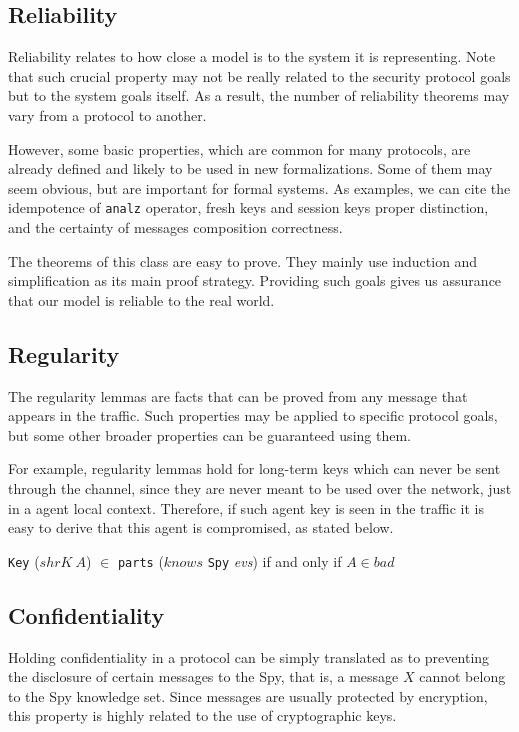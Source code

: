 \subsection{Reliability}
Reliability relates to how close a model is to the system it is representing. Note that such crucial property may not be really related to the security protocol goals but to the system goals itself. As a result, the number of reliability theorems may vary from a protocol to another.

However, some basic properties, which are common for many protocols, are already defined and likely to be used in new formalizations. Some of them may seem obvious, but are important for formal systems. As examples, we can cite the idempotence of \texttt{analz} operator, fresh keys and session keys proper distinction, and the certainty of messages composition correctness.

The theorems of this class are easy to prove. They mainly use induction and simplification as its main proof strategy. Providing such goals gives us assurance that our model is reliable to the real world.



\subsection{Regularity}
The regularity lemmas are facts that can be proved from any message that appears in the traffic. Such properties may be applied to specific protocol goals, but some other broader properties can be guaranteed using them.

For example, regularity lemmas hold for long-term keys which can never be sent through the channel, since they are never meant to be used over the network, just in a agent local context. Therefore, if such agent key is seen in the traffic it is easy to derive that this agent is compromised, as stated below.

\begin{center}
  \texttt{Key} (\(shrK\ A\)) \(\in \) \texttt{parts} (\(knows\) \texttt{Spy} \textit{evs}) if and only if \(A \in bad\)
\end{center}



\subsection{Confidentiality}
Holding confidentiality in a protocol can be simply translated as to preventing the disclosure of certain messages to the Spy, that is, a message \(X\) cannot belong to the Spy knowledge set. Since messages are usually protected by encryption, this property is highly related to the use of cryptographic keys.

